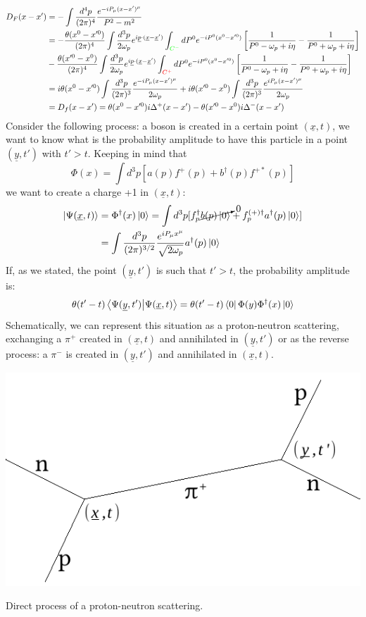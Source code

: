 \documentclass[../main.tex]{subfiles}
\begin{document}
\begin{align*}
D_F(x-x')&=-\int\frac{d^4p}{(2\pi)^4}\frac{e^{-iP_\mu(x-x')^\mu}}{P^2-m^2}\\
&=-\frac{\theta(x^0-x'^0)}{(2\pi)^4}\int\frac{d^3p}{2\omega_p}e^{i\underline{p}\cdot(\underline{x}-\underline{x}')}\int_{{\color{green}C^-}} dP^0e^{-iP^0(x^0-x'^0)}\left[\frac{1}{P^0-\omega_p+i\eta}-\frac{1}{P^0+\omega_p+i\eta}\right]\\
&-\frac{\theta(x'^0-x^0)}{(2\pi)^4}\int\frac{d^3p}{2\omega_p}e^{i\underline{p}\cdot(\underline{x}-\underline{x}')}\int_{{\color{red}C^+}} dP^0e^{-iP^0(x^0-x'^0)}\left[\frac{1}{P^0-\omega_p+i\eta}-\frac{1}{P^0+\omega_p+i\eta}\right]\\
&=i\theta(x^0-x'^0)\int\frac{d^3p}{(2\pi)^3}\frac{e^{-iP_\mu(x-x')^\mu}}{2\omega_p}+i\theta(x'^0-x^0)\int\frac{d^3p}{(2\pi)^3}\frac{e^{iP_\mu(x-x')^\mu}}{2\omega_p}\\
&=D_f(x-x')=\theta(x^0-x'^0)i\Delta^+(x-x')-\theta(x'^0-x^0)i\Delta^-(x-x')
\end{align*}
Consider the following process: a boson is created in a certain point $(\underline{x},t)$, we want to know what is the probability amplitude to have this particle in a point $(\underline{y},t')$ with $t'>t$. Keeping in mind that 
\[
\Phi(x)=\int d^3p[a(p)f^+(p)+b^\dagger(p)f^{+*}(p)]
\]
we want to create a charge +1 in $(\underline{x},t)$:
\begin{align*}
\ket{\Psi(\underline{x},t)}&=\Phi^\dagger(x)\ket{0}=\int d^3p[f_p^\dagger \cancelto{0}{b(p)\ket{0}}+f_p^{(+)\dagger}a^\dagger(p)\ket{0}]\\
&=\int \frac{d^3p}{(2\pi)^{3/2}}\frac{e^{iP_\mu x^\mu}}{\sqrt{2\omega_p}}a^\dagger(p)\ket{0}
\end{align*}
If, as we stated, the point $(\underline{y},t')$ is such that $t'>t$, the probability amplitude is:
\[
\theta(t'-t)\bra{\Psi(\underline{y},t')}\ket{\Psi(\underline{x},t)}=\theta(t'-t)\bra{0}\Phi(y)\Phi^\dagger(x)\ket{0}
\]
Schematically, we can represent this situation as a proton-neutron scattering, exchanging a $\pi^+$ created in $(\underline{x},t)$ and annihilated in $(\underline{y},t')$ or as the reverse process: a $\pi^-$ is created in $(\underline{y},t')$ and annihilated in $(\underline{x},t)$.\begin{marginfigure}
\includegraphics{Images/process.pdf}
\caption{Direct process of a proton-neutron scattering.}
\end{marginfigure}
\end{document}

